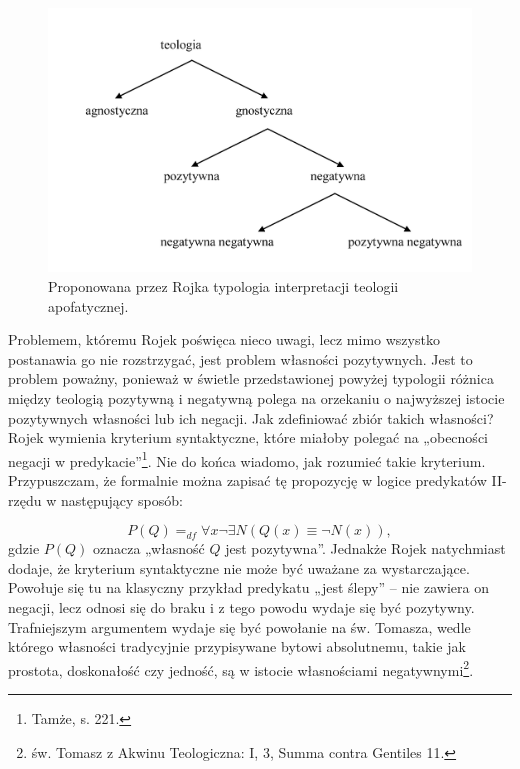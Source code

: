 \begin{figure}[h]
{\centering
\includegraphics[width=1\linewidth]{typologia.jpg}
\caption{Proponowana przez Rojka
typologia interpretacji teologii apofatycznej.}
}
\end{figure}

Problemem, któremu Rojek poświęca nieco uwagi, lecz mimo wszystko
postanawia go nie rozstrzygać, jest problem własności pozytywnych. Jest
to problem poważny, ponieważ w świetle przedstawionej powyżej typologii
różnica między teologią pozytywną i negatywną polega na orzekaniu o
najwyższej istocie pozytywnych własności lub ich negacji. Jak
zdefiniować zbiór takich własności? Rojek wymienia kryterium
syntaktyczne, które miałoby polegać na „obecności negacji w
predykacie”\footnote{Tamże, s. 221. }. Nie do końca wiadomo, jak
rozumieć takie kryterium. Przypuszczam, że formalnie można zapisać tę
propozycję w logice predykatów II-rzędu w następujący sposób:

\begin{equation}
    P(Q) {=}_{df} \forall x \neg \exists N (Q(x) \equiv \neg N(x)),
\end{equation}
gdzie $P(Q)$ oznacza „własność $Q$ jest pozytywna”. Jednakże Rojek
natychmiast dodaje, że kryterium syntaktyczne nie może być uważane za
wystarczające. Powołuje się tu na klasyczny przykład predykatu „jest
ślepy” -- nie zawiera on negacji, lecz odnosi się do braku i z tego
powodu wydaje się być pozytywny. Trafniejszym argumentem wydaje się być
powołanie na św. Tomasza, wedle którego własności tradycyjnie
przypisywane bytowi absolutnemu, takie jak prostota, doskonałość czy
jedność, są w istocie własnościami negatywnymi\footnote{św. Tomasz z
Akwinu Teologiczna: I, 3, Summa contra Gentiles 11. }.

